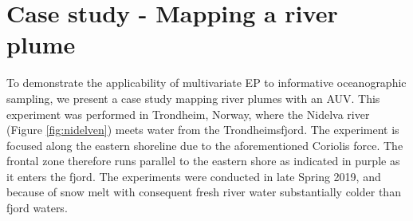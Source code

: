 \documentclass[aoas]{imsart}
\begin{document}
\begin{table}[!h]
    \centering
      \caption{Simulation results for the final mean explained
        variance
        ($\bR^{2}=100*(1-(\bSigma_{posterior}/\bSigma_{initial}))$)
        for 20 replicates, 8 configurations, and 6 strategies.}
    \label{tab:sim_res_r2}
\end{table}

\newpage

\section{Case study - Mapping a river plume}
\label{sec:case_study}

To demonstrate the applicability of multivariate EP to informative
oceanographic sampling, we present a case study mapping river plumes
with an AUV.  This experiment was performed in Trondheim, Norway,
where the Nidelva river (Figure \ref{fig:nidelven}) meets water from
the Trondheimsfjord. The experiment is focused along the eastern
shoreline due to the aforementioned Coriolis
force.%
The frontal zone therefore runs parallel to the eastern shore as
indicated in purple as it enters the fjord. The experiments were
conducted in late Spring 2019, and because of snow melt with
consequent fresh river water substantially colder than fjord waters.
\end{document}
